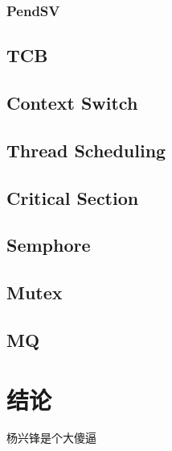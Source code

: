 \subsection{PendSV }
\section{TCB}
\section{Context Switch}
\section{Thread Scheduling}

\section{Critical Section}
\section{Semphore}
\section{Mutex}
\section{MQ}




\chapter*{结\quad 论}

杨兴锋是个大傻逼